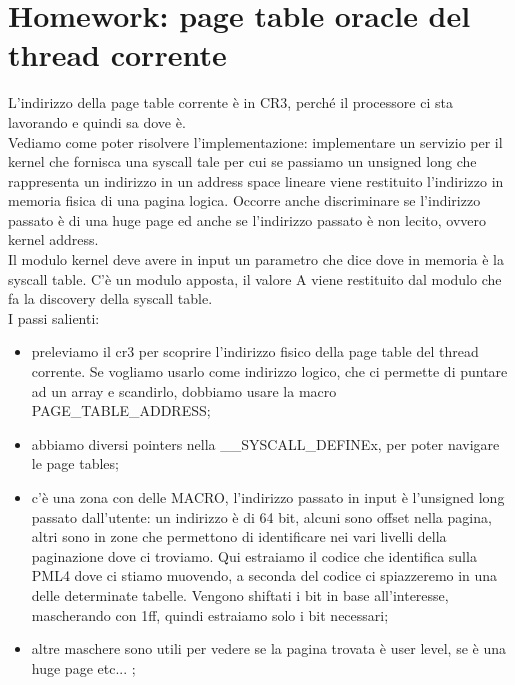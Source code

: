 \documentclass[12pt, oneside]{extbook}
\begin{document}
\section*{Homework: page table oracle del thread corrente}
L'indirizzo della page table corrente è in CR3, perché il processore ci sta lavorando e quindi sa dove è.\\ Vediamo come poter risolvere l'implementazione: implementare un servizio per il kernel che fornisca una syscall tale per cui se passiamo un unsigned long che rappresenta un indirizzo in un address space lineare viene restituito l'indirizzo in memoria fisica di una pagina logica. Occorre anche discriminare se l'indirizzo passato è di una huge page ed anche se l'indirizzo passato è non lecito, ovvero kernel address.\\ Il modulo kernel deve avere in input un parametro che dice dove in memoria è la syscall table. C'è un modulo apposta, il valore A viene restituito dal modulo che fa la discovery della syscall table.\\ I passi salienti:
\begin{itemize}
\item preleviamo il cr3 per scoprire l'indirizzo fisico della page table del thread corrente. Se vogliamo usarlo come indirizzo logico, che ci permette di puntare ad un array e scandirlo, dobbiamo usare la macro \textsf{PAGE\_TABLE\_ADDRESS};
\item abbiamo diversi pointers nella \_\_SYSCALL\_DEFINEx, per poter navigare le page tables;
\item c'è una zona con delle MACRO, l'indirizzo passato in input è l'unsigned long passato dall'utente: un indirizzo è di 64 bit, alcuni sono offset nella pagina, altri sono in zone che permettono di identificare nei vari livelli della paginazione dove ci troviamo. Qui estraiamo il codice che identifica sulla PML4 dove ci stiamo muovendo, a seconda del codice ci spiazzeremo in una delle determinate tabelle. Vengono shiftati i bit in base all'interesse, mascherando con 1ff, quindi estraiamo solo i bit necessari;
\item altre maschere sono utili per vedere se la pagina trovata è user level, se è una huge page etc... ;
\end{itemize}
\end{document}
